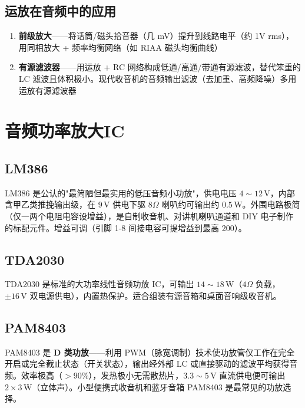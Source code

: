\documentclass[12pt,UTF8]{ctexbook}
\begin{document}
\subsection{运放在音频中的应用}


\begin{enumerate}
\item \textbf{前级放大}——将话筒/磁头拾音器（几 mV）提升到线路电平（约 1V rms），用同相放大 + 频率均衡网络（如 RIAA 磁头均衡曲线）
\item \textbf{有源滤波器}——用运放 + RC 网络构成低通/高通/带通有源滤波，替代笨重的 LC 滤波且体积极小。现代收音机的音频输出滤波（去加重、高频降噪）多用运放有源滤波器
\end{enumerate}

\section{音频功率放大IC}
\label{sec:audio_power_ic}

\subsection{LM386}

LM386 是公认的"最简陋但最实用的低压音频小功放"，供电电压 $4\sim12\,\mathrm{V}$，内部含甲乙类推挽输出级，在 $9\,\mathrm{V}$ 供电下驱 $8\Omega$ 喇叭约可输出约 $0.5\,\mathrm{W}$。外围电路极简（仅一两个电阻电容设增益），是自制收音机、对讲机喇叭通道和 DIY 电子制作的标配元件。增益可调（引脚 1-8 间接电容可提增益到最高 200）。

\subsection{TDA2030}

TDA2030 是标准的大功率线性音频功放 IC，可输出 $14\sim18\,\mathrm{W}$（$4\Omega$ 负载，$\pm16\,\mathrm{V}$ 双电源供电），内置热保护。适合组装有源音箱和桌面音响级收音机。

\subsection{PAM8403}

PAM8403 是 \textbf{D 类功放}——利用 PWM（脉宽调制）技术使功放管仅工作在完全开启或完全截止状态（开关状态），输出经外部 LC 或直接驱动的滤波平均获得音频。效率极高（$>90\%$），发热极小无需散热片，$3.3\sim5\,\mathrm{V}$ 直流供电便可输出 $2\times3\,\mathrm{W}$（立体声）。小型便携式收音机和蓝牙音箱 PAM8403 是最常见的功放选择。
\end{document}
